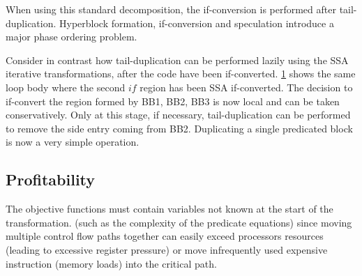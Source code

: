 \begin{figure}[h]
{    \label{fig:hyper4}}
\end{figure}

When using this standard decomposition, the if-conversion is performed after tail-duplication. Hyperblock formation, if-conversion and speculation introduce a major phase ordering problem. 

Consider in contrast how tail-duplication can be performed lazily using the SSA iterative transformations, after the code have been if-converted. \ref{fig:hyper4} shows the same loop body where the second $if$ region has been SSA if-converted. The decision to if-convert the region formed by {BB1, BB2, BB3} is now local and can be taken conservatively. Only at this stage, if necessary, tail-duplication can be performed to remove the side entry coming from BB2. Duplicating a single predicated block is now a very simple operation.

\subsection{Profitability}

The objective functions must contain variables not known at the start of the transformation. (such as the complexity of the predicate equations) since moving multiple control flow paths together can easily exceed processors resources (leading to excessive register pressure) or move infrequently used expensive instruction (memory loads) into the critical path. 

